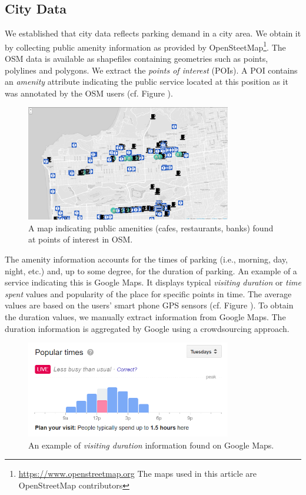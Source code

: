 \subsection{City Data}
\label{sec:citydata}
We established that city data reflects parking demand in a city area. We obtain it by collecting public amenity information as provided by OpenSteetMap\footnote{\url{https://www.openstreetmap.org} The maps used in this article are \textcopyright OpenStreetMap contributors}. The OSM data is available as shapefiles containing geometries such as points, polylines and polygons. We extract the \textit{points of interest} (POIs). A POI contains an \textit{amenity} attribute indicating the public service located at this position as it was annotated by the OSM users (cf. Figure ).

\begin{figure}[!ht]
	\centering
	\includegraphics[width=0.8\textwidth]{graphics/cafes_restaurants_banks_larger.png}
	\caption{A map indicating public amenities (cafes, restaurants, banks) found at points of interest in OSM.}
	\label{fig:pois}
\end{figure}

The amenity information accounts for the times of parking (i.e., morning, day, night, etc.) and, up to some degree, for the duration of parking. An example of a service indicating this is Google Maps.
It displays typical \textit{visiting duration} or \textit{time spent} values and popularity of the place for specific points in time. The average values are based on the users' smart phone GPS sensors (cf. Figure ). To obtain the duration values, we manually extract information from Google Maps. The duration information is aggregated by Google using a crowdsourcing approach. 

\begin{figure}[!ht]
	\centering
	\includegraphics[width=0.8\textwidth]{graphics/google_visit_duration.png}
	\caption{An example of \textit{visiting duration} information found on Google Maps.}
	\label{fig:visit_duration}
\end{figure}

